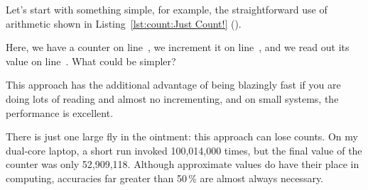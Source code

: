 Let's start with something simple, for example, the straightforward
use of arithmetic shown in
Listing~\ref{lst:count:Just Count!} ().
\begin{fcvref}
Here, we have a counter on line~, we increment it on
line~, and we read out its value on line~.
What could be simpler?
\end{fcvref}

\begin{listing}[tbp]

\caption{Just Count!}
\label{lst:count:Just Count!}
\end{listing}

This approach has the additional advantage of being blazingly fast if
you are doing lots of reading and almost no incrementing, and on small
systems, the performance is excellent.

There is just one large fly in the ointment: this approach can lose
counts.
On my dual-core laptop, a short run invoked 
100,014,000 times, but the final value of the counter was only
52,909,118.
Although approximate values do have their place in computing,
accuracies far greater than 50\,\% are almost always necessary.

